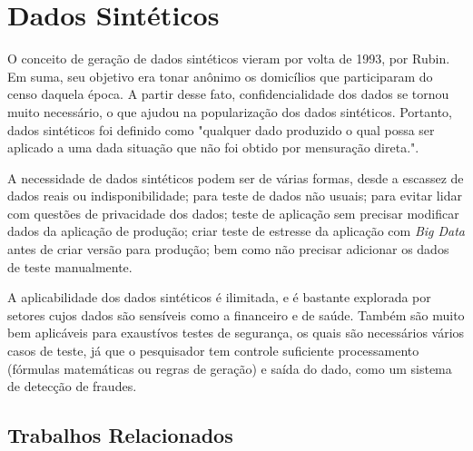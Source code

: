\documentclass[
	12pt,				%
	openright,			%
	twoside,			%
	a4paper,			%
	english,			%
	brazil				%
	]{abntex2}
\begin{document}

	\section{Dados Sintéticos}
	O conceito de geração de dados sintéticos vieram por volta de 1993, por Rubin. \cite{rubin1993statistical}
	Em suma, seu objetivo era tonar anônimo os domicílios que participaram do censo daquela época.
	A partir desse fato, confidencialidade dos dados se tornou muito necessário, o que ajudou na popularização dos dados sintéticos.
	Portanto, dados sintéticos foi definido como "qualquer dado produzido o qual possa ser aplicado a uma dada situação que não foi obtido por mensuração direta.". \cite{mcgraw-hilleducation2016}
	\par
	A necessidade de dados sintéticos podem ser de várias formas, 
	desde a escassez de dados reais ou indisponibilidade;
	 para teste de dados não usuais;
	 para evitar lidar com questões de privacidade dos dados;
	 teste de aplicação sem precisar modificar dados da aplicação de produção;
	 criar teste de estresse da aplicação com \emph{Big Data} antes de criar versão para produção;
	 bem como não precisar adicionar os dados de teste manualmente. \cite{top15DatagenTools2019}
	\par
	A aplicabilidade dos dados sintéticos é ilimitada, e é bastante explorada por setores cujos dados são sensíveis como a financeiro \cite{lopez2012money} e de saúde. \cite{bergeat2014french} 	
	Também são muito bem aplicáveis para exaustívos testes de segurança, os quais são necessários vários casos de teste, já que o pesquisador tem controle suficiente processamento (fórmulas matemáticas ou regras de geração) e saída do dado, como um sistema de detecção de fraudes. \cite{barse2003synthesizing}
	 
	\subsection{Trabalhos Relacionados}
	
\end{document}
